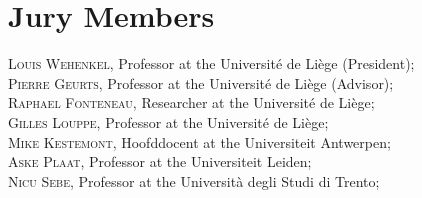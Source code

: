 


\begingroup
\let\clearpage\relax
\let\cleardoublepage\relax
\let\cleardoublepage\relax

\chapter*{Jury Members}
\endgroup		

\noindent \textsc{Louis Wehenkel}, Professor at the Universit\'e de Li\`ege (President); \\

\noindent \textsc{Pierre Geurts}, Professor at the Universit\'e de Li\`ege (Advisor); \\

\noindent \textsc{Raphael Fonteneau}, Researcher at the Universit\'e de Li\`ege; \\

\noindent \textsc{Gilles Louppe}, Professor at the Universit\'e de Li\`ege; \\

\noindent \textsc{Mike Kestemont}, Hoofddocent at the Universiteit Antwerpen; \\

\noindent \textsc{Aske Plaat}, Professor at the Universiteit Leiden; \\

\noindent \textsc{Nicu Sebe}, Professor at the Universit\`a degli Studi di Trento; \\

\vfill
